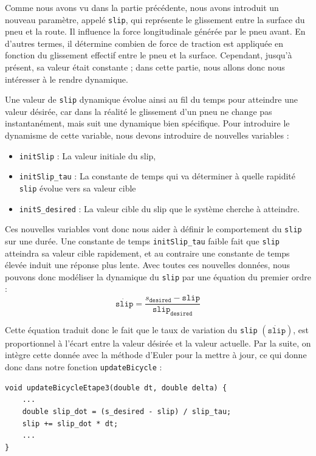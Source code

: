 Comme nous avons vu dans la partie précédente, nous avons introduit un nouveau paramètre, appelé \texttt{slip}, qui représente le glissement entre la surface du pneu et la route.
Il influence la force longitudinale générée par le pneu avant.
En d'autres termes, il détermine combien de force de traction est appliquée en fonction du glissement effectif entre le pneu et la surface.
Cependant, jusqu'à présent, sa valeur était constante ; dans cette partie, nous allons donc nous intéresser à le rendre dynamique.

Une valeur de \texttt{slip} dynamique évolue ainsi au fil du temps pour atteindre une valeur désirée, car dans la réalité le glissement d'un pneu ne change pas instantanément, mais suit une dynamique bien spécifique.
Pour introduire le dynamisme de cette variable, nous devons introduire de nouvelles variables :

\begin{itemize}
\item \texttt{initSlip} : La valeur initiale du slip,

\item \texttt{initSlip\_tau} : La constante de temps qui va déterminer à quelle rapidité \texttt{slip} évolue vers sa valeur cible

\item \texttt{initS\_desired} : La valeur cible du slip que le système cherche à atteindre.

\end{itemize}

Ces nouvelles variables vont donc nous aider à définir le comportement du \texttt{slip} sur une durée.
Une constante de temps \texttt{initSlip\_tau} faible fait que \texttt{slip} atteindra sa valeur cible rapidement, et au contraire une constante de temps élevée induit une réponse plus lente.
Avec toutes ces nouvelles données, nous pouvons donc modéliser la dynamique du \texttt{slip} par une équation du premier ordre :
$$\dot{\texttt{slip}} = \frac{s_{\texttt{desired}} - \texttt{slip}}{\texttt{slip}_{\texttt{desired}}}$$

Cette équation traduit donc le fait que le taux de variation du \texttt{slip} $(\dot{\texttt{slip}})$, est proportionnel à l'écart entre la valeur désirée et la valeur actuelle.
Par la suite, on intègre cette donnée avec la méthode d'Euler pour la mettre à jour, ce qui donne donc dans notre fonction \texttt{updateBicycle} :

\begin{lstlisting}[style=CStyle,label={lst:code_update_bicycle_etape3}]
void updateBicycleEtape3(double dt, double delta) {
    ...
    double slip_dot = (s_desired - slip) / slip_tau;
    slip += slip_dot * dt;
    ...
}
\end{lstlisting}

